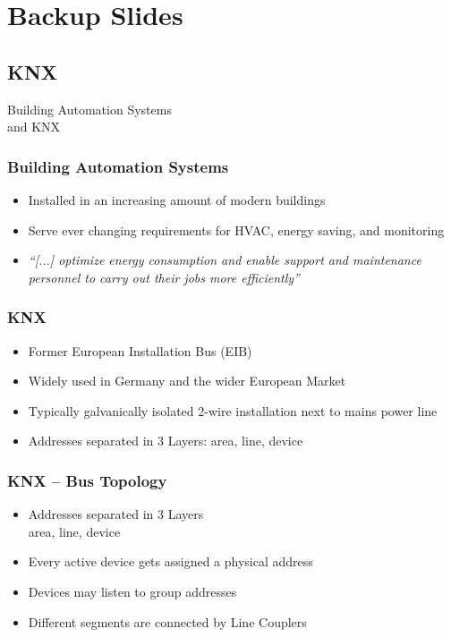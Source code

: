 \section{Backup Slides}
\label{part:backup}

\subsection{KNX}
\begin{frame}[c]
	\centering
	\LARGE Building Automation Systems\\and KNX
\end{frame}

\begin{frame}[c]
	\frametitle{Building Automation Systems}
	\begin{itemize}
		\item Installed in an increasing amount of modern buildings
		\item Serve ever changing requirements for HVAC, energy saving, and monitoring
		\item \textit{\enquote{[...] optimize energy consumption and enable support and maintenance personnel to carry out their jobs more efficiently}} \parencite{Merz2009}
	\end{itemize}
	
	\note{}
\end{frame}

\begin{frame}[c]
	\frametitle{KNX}
	\begin{itemize}
		\item Former European Installation Bus (EIB)
		\item Widely used in Germany and the wider European Market
		\item Typically galvanically isolated 2-wire installation next to mains power line
		\item Addresses separated in 3 Layers: area, line, device
	\end{itemize}
	
\end{frame}

\begin{frame}[c]
	\frametitle{KNX -- Bus Topology}
	\begin{itemize}
		\item Addresses separated in 3 Layers\\area, line, device
		\item Every active device gets assigned a physical address
		\item Devices may listen to group addresses
		\item Different segments are connected by Line Couplers
	\end{itemize}
\end{frame}

